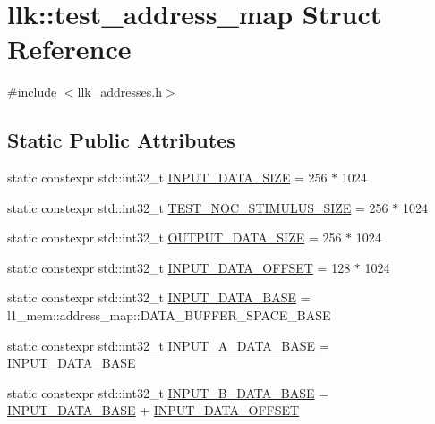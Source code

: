 \hypertarget{structllk_1_1test__address__map}{}\section{llk\+:\+:test\+\_\+address\+\_\+map Struct Reference}
\label{structllk_1_1test__address__map}


{\ttfamily \#include $<$llk\+\_\+addresses.\+h$>$}

\subsection*{Static Public Attributes}
\begin{DoxyCompactItemize}
\item 
static constexpr std\+::int32\+\_\+t \hyperlink{structllk_1_1test__address__map_af93ac7086d8cd7aa23029e19d3ef046d}{I\+N\+P\+U\+T\+\_\+\+D\+A\+T\+A\+\_\+\+S\+I\+ZE} = 256 $\ast$ 1024
\item 
static constexpr std\+::int32\+\_\+t \hyperlink{structllk_1_1test__address__map_a2e772fcd41be9095c510e88ddee25e2b}{T\+E\+S\+T\+\_\+\+N\+O\+C\+\_\+\+S\+T\+I\+M\+U\+L\+U\+S\+\_\+\+S\+I\+ZE} = 256 $\ast$ 1024
\item 
static constexpr std\+::int32\+\_\+t \hyperlink{structllk_1_1test__address__map_af547ec824c5232455ea2a427fa138406}{O\+U\+T\+P\+U\+T\+\_\+\+D\+A\+T\+A\+\_\+\+S\+I\+ZE} = 256 $\ast$ 1024
\item 
static constexpr std\+::int32\+\_\+t \hyperlink{structllk_1_1test__address__map_a8b97d68e72825ada2a073d1a16c63291}{I\+N\+P\+U\+T\+\_\+\+D\+A\+T\+A\+\_\+\+O\+F\+F\+S\+ET} = 128 $\ast$ 1024
\item 
static constexpr std\+::int32\+\_\+t \hyperlink{structllk_1_1test__address__map_a9763e06ea1548f6ba96d81917d160aca}{I\+N\+P\+U\+T\+\_\+\+D\+A\+T\+A\+\_\+\+B\+A\+SE} = l1\+\_\+mem\+::address\+\_\+map\+::\+D\+A\+T\+A\+\_\+\+B\+U\+F\+F\+E\+R\+\_\+\+S\+P\+A\+C\+E\+\_\+\+B\+A\+SE
\item 
static constexpr std\+::int32\+\_\+t \hyperlink{structllk_1_1test__address__map_aa7e777bfe390089b1ecc644e5235e7d4}{I\+N\+P\+U\+T\+\_\+\+A\+\_\+\+D\+A\+T\+A\+\_\+\+B\+A\+SE} = \hyperlink{structllk_1_1test__address__map_a9763e06ea1548f6ba96d81917d160aca}{I\+N\+P\+U\+T\+\_\+\+D\+A\+T\+A\+\_\+\+B\+A\+SE}
\item 
static constexpr std\+::int32\+\_\+t \hyperlink{structllk_1_1test__address__map_a161f7bddf7faeec9b275f611caaac750}{I\+N\+P\+U\+T\+\_\+\+B\+\_\+\+D\+A\+T\+A\+\_\+\+B\+A\+SE} = \hyperlink{structllk_1_1test__address__map_a9763e06ea1548f6ba96d81917d160aca}{I\+N\+P\+U\+T\+\_\+\+D\+A\+T\+A\+\_\+\+B\+A\+SE} + \hyperlink{structllk_1_1test__address__map_a8b97d68e72825ada2a073d1a16c63291}{I\+N\+P\+U\+T\+\_\+\+D\+A\+T\+A\+\_\+\+O\+F\+F\+S\+ET}

\end{DoxyCompactItemize}
